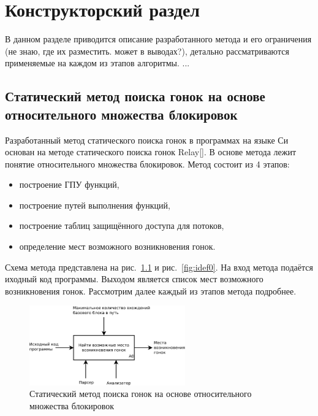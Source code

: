 \chapter{Конструкторский раздел}
\label{cha:design}

В данном разделе приводится описание разработанного метода и его ограничения (не знаю, где их разместить. может в выводах?), детально рассматриваются применяемые на каждом из этапов алгоритмы. ...

\section{Статический метод поиска гонок на основе относительного множества блокировок}

Разработанный метод статического поиска гонок в программах на языке Си основан на методе статического поиска гонок Relay[]. В основе метода лежит понятие относительного множества блокировок. Метод состоит из 4 этапов:

\begin{itemize}
  \item построение ГПУ функций,
  \item построение путей выполнения  функций,
  \item построение таблиц защищённого доступа для потоков,
  \item определение мест возможного возникновения гонок.
\end{itemize}

Схема метода представлена на рис.~\ref{fig:idef0-black-box} и рис.~\ref{fig:idef0}. На вход метода подаётся иходный код программы. Выходом является список мест возможного возникновения гонок. Рассмотрим далее каждый из этапов метода подробнее.

\begin{figure}
  \centering
  \includegraphics[width=0.6\textwidth]{inc/dia/idef0-black-box}
  \caption{Статический метод поиска гонок на основе относительного множества блокировок}
  \label{fig:idef0-black-box}
\end{figure}

